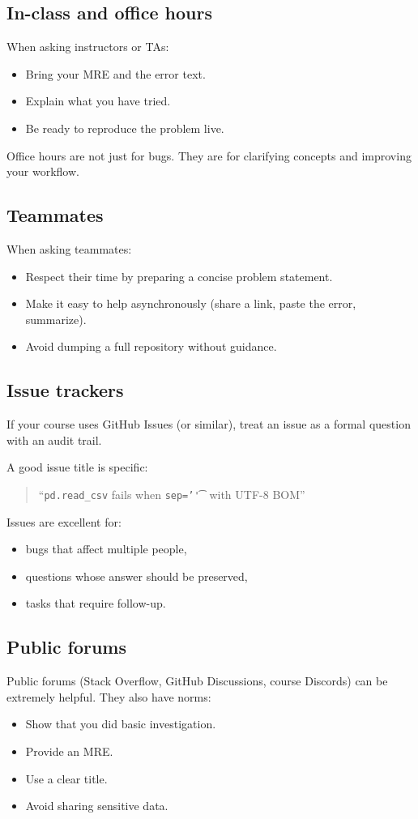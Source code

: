 \subsection{In-class and office hours}
When asking instructors or TAs:
\begin{itemize}[noitemsep]
  \item Bring your MRE and the error text.
  \item Explain what you have tried.
  \item Be ready to reproduce the problem live.
\end{itemize}

Office hours are not just for bugs. They are for clarifying concepts and improving your workflow.

\subsection{Teammates}
When asking teammates:
\begin{itemize}[noitemsep]
  \item Respect their time by preparing a concise problem statement.
  \item Make it easy to help asynchronously (share a link, paste the error, summarize).
  \item Avoid dumping a full repository without guidance.
\end{itemize}

\subsection{Issue trackers}
If your course uses GitHub Issues (or similar), treat an issue as a formal question with an audit trail.

A good issue title is specific:
\begin{quote}
``\texttt{pd.read\_csv} fails when \texttt{sep='\t'} with UTF-8 BOM''
\end{quote}

Issues are excellent for:
\begin{itemize}[noitemsep]
  \item bugs that affect multiple people,
  \item questions whose answer should be preserved,
  \item tasks that require follow-up.
\end{itemize}

\subsection{Public forums}
Public forums (Stack Overflow, GitHub Discussions, course Discords) can be extremely helpful. They also have norms:
\begin{itemize}[noitemsep]
  \item Show that you did basic investigation.
  \item Provide an MRE.
  \item Use a clear title.
  \item Avoid sharing sensitive data.
\end{itemize}

